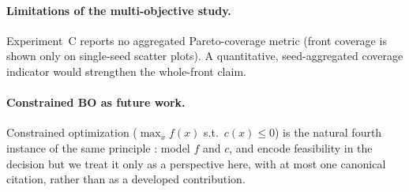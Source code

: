 \paragraph{Limitations of the multi-objective study.}
Experiment~C reports
no aggregated Pareto-coverage metric (front coverage is shown only on single-seed
scatter plots). A quantitative, seed-aggregated coverage indicator would
strengthen the whole-front claim.

\paragraph{Constrained BO as future work.}
Constrained optimization ($\max_x f(x)$ s.t.\ $c(x)\le0$) is the natural fourth
instance of the same principle : model $f$ and $c$, and encode feasibility in
the decision but we treat it only as a perspective here, with at most one
canonical citation, rather than as a developed contribution.
